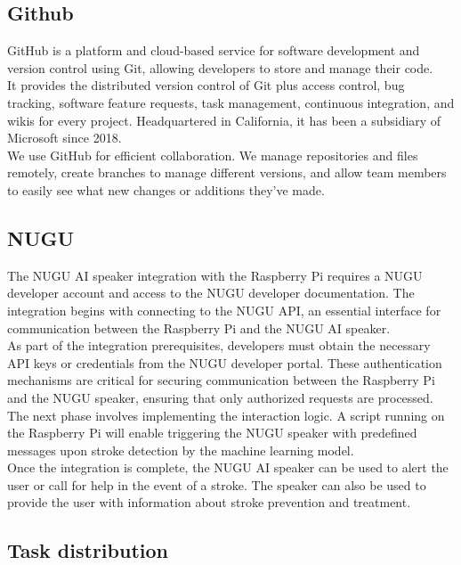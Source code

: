 \subsection{\textbf{Github}}
\cite{github} GitHub is a platform and cloud-based service for software development and version control using Git, allowing developers to store and manage their code. 
\\

It provides the distributed version control of Git plus access control, bug tracking, software feature requests, task management, continuous integration, and wikis for every project. Headquartered in California, it has been a subsidiary of Microsoft since 2018.
\\

We use GitHub for efficient collaboration. We manage repositories and files remotely, create branches to manage different versions, and allow team members to easily see what new changes or additions they've made.\\

\subsection{\textbf{NUGU}}

The NUGU AI speaker integration with the Raspberry Pi requires a NUGU developer account and access to the NUGU developer documentation. The integration begins with connecting to the NUGU API, an essential interface for communication between the Raspberry Pi and the NUGU AI speaker.
\\

As part of the integration prerequisites, developers must obtain the necessary API keys or credentials from the NUGU developer portal. These authentication mechanisms are critical for securing communication between the Raspberry Pi and the NUGU speaker, ensuring that only authorized requests are processed. The next phase involves implementing the interaction logic. A script running on the Raspberry Pi will enable triggering the NUGU speaker with predefined messages upon stroke detection by the machine learning model.
\\

Once the integration is complete, the NUGU AI speaker can be used to alert the user or call for help in the event of a stroke. The speaker can also be used to provide the user with information about stroke prevention and treatment.

\subsection{\textbf{Task distribution}}
